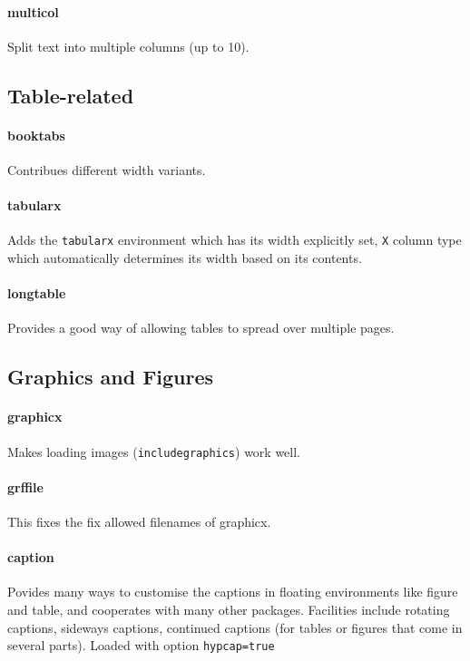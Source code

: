 \documentclass[solid,math,chem,code,plot]{bmc}
\begin{document}
\paragraph{\ttfamily multicol}\label{par:multicol}
Split text into multiple columns (up to 10).

\subsection{Table-related}

\paragraph{\ttfamily booktabs}\label{par:booktabs}
Contribues different width \texttt{\hline} variants.
\paragraph{\ttfamily tabularx}\label{par:tabularx}
Adds the \texttt{tabularx} environment which has its width explicitly set,
\texttt{X} column type which automatically determines its width based on its contents.
\paragraph{\ttfamily longtable}\label{par:longtable}
Provides a good way of allowing tables to spread over multiple pages.

\subsection{Graphics and Figures}

\paragraph{\ttfamily graphicx}\label{par:graphicx}
Makes loading images (\texttt{includegraphics}) work well.
\paragraph{\ttfamily grffile}\label{par:grffile}
This fixes the fix allowed filenames of graphicx.
\paragraph{\ttfamily caption}\label{par:caption}
Povides many ways to customise the captions in floating environments like figure and table,
and cooperates with many other packages.
Facilities include rotating captions, sideways captions, continued captions (for tables or figures that come in several parts).
Loaded with option \texttt{hypcap=true}
\end{document}
